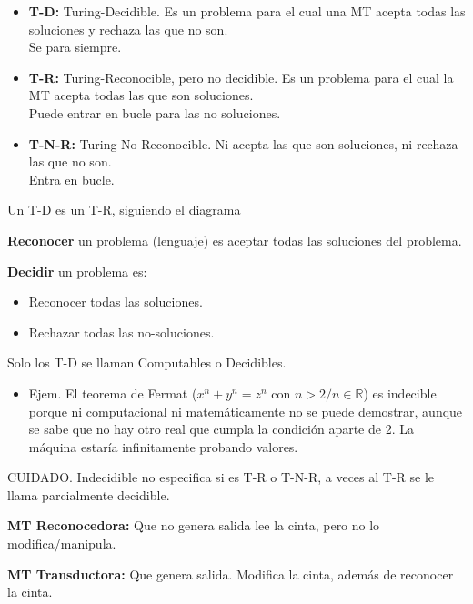 \begin{figure}[H]
    {
    }
\end{figure}
\begin{itemize}
    \item \textbf{T-D:} Turing-Decidible. Es un problema para el cual una MT acepta todas las soluciones y rechaza las que no son. \\ Se para siempre.
    \item \textbf{T-R:} Turing-Reconocible, pero no decidible. Es un problema para el cual la MT acepta todas las que son soluciones. \\ Puede entrar en bucle para las no soluciones.
    \item \textbf{T-N-R:} Turing-No-Reconocible. Ni acepta las que son soluciones, ni rechaza las que no son. \\ Entra en bucle.
\end{itemize}

Un T-D es un T-R, siguiendo el diagrama

\textbf{Reconocer} un problema (lenguaje) es aceptar todas las soluciones del problema.

\textbf{Decidir} un problema es:
\begin{itemize}
    \item Reconocer todas las soluciones.
    \item Rechazar todas las no-soluciones.
\end{itemize}

Solo los T-D se llaman Computables o Decidibles.
\begin{itemize}
    \item Ejem. El teorema de Fermat ($x^n + y^n = z^n$ con $n>2 / n \in \mathbb{R}$) es indecible porque ni computacional ni matemáticamente no se puede demostrar, aunque se sabe que no hay otro real que cumpla la condición aparte de 2. La máquina estaría infinitamente probando valores.
\end{itemize}

CUIDADO. Indecidible no especifica si es T-R o T-N-R, a veces al T-R se le llama parcialmente decidible.

\textbf{MT Reconocedora:} Que no genera salida lee la cinta, pero no lo modifica/manipula.

\textbf{MT Transductora:} Que genera salida. Modifica la cinta, además de reconocer la cinta.